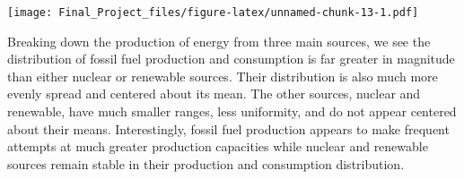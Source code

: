 \documentclass[
]{article}
\newenvironment{Shaded}{\begin{snugshade}}{\end{snugshade}}
\newcommand{\DataTypeTok}[1]{\textcolor[rgb]{0.13,0.29,0.53}{#1}}
\newcommand{\DecValTok}[1]{\textcolor[rgb]{0.00,0.00,0.81}{#1}}
\newcommand{\FloatTok}[1]{\textcolor[rgb]{0.00,0.00,0.81}{#1}}
\newcommand{\KeywordTok}[1]{\textcolor[rgb]{0.13,0.29,0.53}{\textbf{#1}}}
\newcommand{\NormalTok}[1]{#1}
\newcommand{\OperatorTok}[1]{\textcolor[rgb]{0.81,0.36,0.00}{\textbf{#1}}}
\newcommand{\StringTok}[1]{\textcolor[rgb]{0.31,0.60,0.02}{#1}}
\begin{document}
\begin{Shaded}
\end{Shaded}

\texttt{[image: Final\_Project\_files/figure-latex/unnamed-chunk-13-1.pdf]}

Breaking down the production of energy from three main sources, we see
the distribution of fossil fuel production and consumption is far
greater in magnitude than either nuclear or renewable sources. Their
distribution is also much more evenly spread and centered about its
mean. The other sources, nuclear and renewable, have much smaller
ranges, less uniformity, and do not appear centered about their means.
Interestingly, fossil fuel production appears to make frequent attempts
at much greater production capacities while nuclear and renewable
sources remain stable in their production and consumption distribution.
\end{document}
